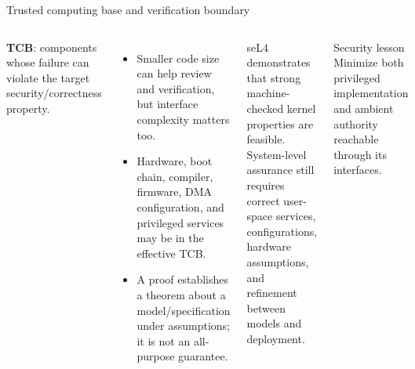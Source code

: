 \documentclass[aspectratio=169,11pt]{beamer}
\newcommand{\concept}[1]{\textcolor{osblue}{\textbf{#1}}}
\begin{document}
\begin{frame}{Trusted computing base and verification boundary}
  \begin{columns}[T,onlytextwidth]
      \concept{TCB}: components whose failure can violate the target security/correctness property.
      \begin{itemize}
        \item Smaller code size can help review and verification, but interface complexity matters too.
        \item Hardware, boot chain, compiler, firmware, DMA configuration, and privileged services may be in the effective TCB.
        \item A proof establishes a theorem about a model/specification under assumptions; it is not an all-purpose guarantee.
      \end{itemize}
      \begin{tcolorbox}[title=Example: seL4]
        seL4 demonstrates that strong machine-checked kernel properties are feasible. System-level assurance still requires correct user-space services, configurations, hardware assumptions, and refinement between models and deployment.
      \end{tcolorbox}
      \begin{alertblock}{Security lesson}
        Minimize both privileged implementation and ambient authority reachable through its interfaces.
      \end{alertblock}
  \end{columns}
\end{frame}
\end{document}
